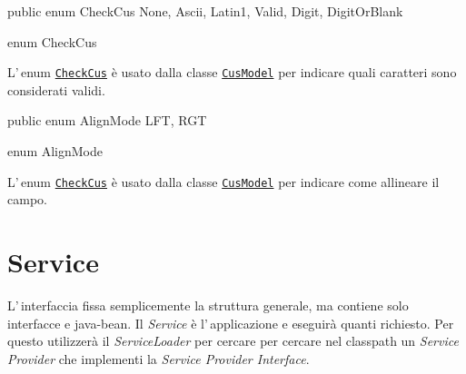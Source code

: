 \documentclass[a4paper,10pt]{report}
\newif\ifesource
\newenvironment{elisting}[1][!htb]
  {\captionsetup{aboveskip=0pt}\begin{listing}[#1]}
  {\end{listing}%
}
\begin{document}
\ifesource
\begin{lstlisting}[language=java, 
caption=enum CheckCus, 
label=lst:CheckCus]
public enum CheckCus { None, Ascii, Latin1, Valid, Digit, DigitOrBlank }
\end{lstlisting}\index{CheckCus}
\else
\begin{elisting}
\begin{javacode}
public enum CheckCus { None, Ascii, Latin1, Valid, Digit, DigitOrBlank }
\end{javacode}
\caption{enum CheckCus}\label{lst:CheckCus}
\end{elisting}
\fi
L'\,enum \hyperref[lst:CheckCus]{\texttt{CheckCus}} è usato dalla classe
\hyperref[lst:CusModel]{\texttt{CusModel}} per indicare quali caratteri sono
considerati validi.



\ifesource
\begin{lstlisting}[language=java, 
caption=enum AlignMode, 
label=lst:AlignMode]
public enum AlignMode { LFT, RGT }
\end{lstlisting}\index{AlignMode}
\else
\begin{elisting}
\begin{javacode}
public enum AlignMode { LFT, RGT }
\end{javacode}
\caption{enum AlignMode}\label{lst:AlignMode}
\end{elisting}
\fi
L'\,enum \hyperref[lst:CheckCus]{\texttt{CheckCus}} è usato dalla classe
\hyperref[lst:CusModel]{\texttt{CusModel}} per indicare come allineare il campo.


\vfill


%                                  

\chapter{Service}
L'\,interfaccia fissa semplicemente la struttura generale, ma contiene solo
interfacce e java-bean.
Il \textsl{Service} è l'\,applicazione e eseguirà quanti richiesto.
Per questo utilizzerà il \textsl{ServiceLoader} per cercare per cercare nel 
classpath un \textsl{Service Provider} che implementi la \textsl{Service 
Provider Interface}.
\end{document}
